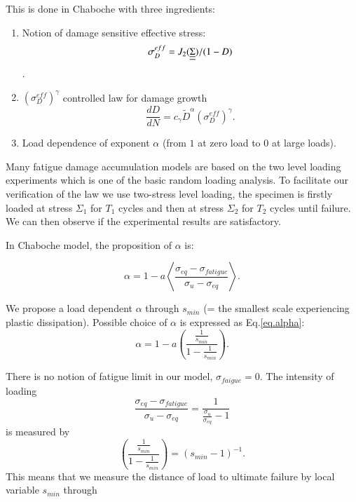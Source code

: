\documentclass[3p,times,number,review]{elsarticle}
\begin{document}
This is done in Chaboche  with three ingredients:

\begin{enumerate} 
	\vspace{6pt}
	\item Notion of damage sensitive effective stress: 
	$$\sigma_D^{eff} = J_2(\uline{\uline{\Sigma}})/(1-D)$$.
	
	\vspace{6pt}
	
	\item $(\sigma_D^{eff})^\gamma$ controlled  law for damage growth
	$$
	\dfrac{dD}{dN} =c_\gamma {\tilde{D}}^\alpha (\sigma_D^{eff})^\gamma.
	$$
	
	\vspace{6pt}
	
	\item  Load dependence of exponent $\alpha$ (from $1$ at zero load to $0$ at large loads).
\end{enumerate}

Many fatigue damage accumulation models are based on the two level loading experiments which is one of the basic random loading analysis. To facilitate our verification of the law we use two-stress level loading, the specimen is firstly loaded at stress $\Sigma_1$ for $T_1$ cycles and then at stress $\Sigma_2$ for $T_2$ cycles until failure. We can then observe if the experimental results are satisfactory.

In Chaboche model, the proposition of $\alpha$ is:

\begin{equation}
\alpha = 1 - a\left\langle \frac{ \sigma_{eq}-\sigma_{fatigue}}{ \sigma_{u} - \sigma_{eq}}\right\rangle.
\end{equation}

We propose a load dependent $\alpha$ through $s_{min}$ (= the smallest scale experiencing plastic dissipation). Possible choice
 of $\alpha$ is expressed as Eq.\eqref{eq.alpha}:
\begin{equation}
\alpha=1-a\left( \dfrac{\frac{1}{s_{min}}}{1-\frac{1}{s_{min}}} \right) .
\label{eq.alpha}
\end{equation}

There is no notion of fatigue limit in our model, $\sigma_{faigue}=0$. The intensity of loading
 $$\frac{ \sigma_{eq}-\sigma_{fatigue}}{ \sigma_{u} - \sigma_{eq}}= \frac{ 1}{\frac{\sigma_{u}}{\sigma_{eq}} -1}$$
 is measured by 
$$\left( \dfrac{\frac{1}{s_{min}}}{1-\frac{1}{s_{min}}}\right) =\left(s_{min}-1 \right) ^{-1}.$$
This means that we measure the distance of load to ultimate failure by local variable $s_{min}$ through 
\end{document}
